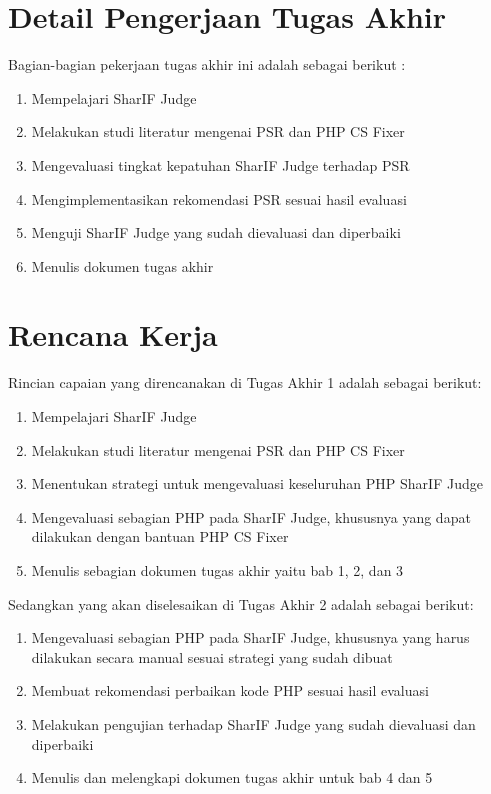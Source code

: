 \documentclass[a4paper,twoside]{article}
\begin{document}
	\section{Detail Pengerjaan Tugas Akhir}
	Bagian-bagian pekerjaan tugas akhir ini adalah sebagai berikut :
	\begin{enumerate}
		\item Mempelajari SharIF Judge 
		\item Melakukan studi literatur mengenai PSR dan PHP CS Fixer
		\item Mengevaluasi tingkat kepatuhan SharIF Judge terhadap PSR
		\item Mengimplementasikan rekomendasi PSR sesuai hasil evaluasi
		\item Menguji SharIF Judge yang sudah dievaluasi dan diperbaiki
		\item Menulis dokumen tugas akhir
	\end{enumerate}
	
	\section{Rencana Kerja}
	Rincian capaian yang direncanakan di Tugas Akhir 1 adalah sebagai berikut:
	\begin{enumerate}
		\item Mempelajari SharIF Judge
		\item Melakukan studi literatur mengenai PSR dan PHP CS Fixer
		\item Menentukan strategi untuk mengevaluasi keseluruhan PHP SharIF Judge
		\item Mengevaluasi sebagian PHP pada SharIF Judge, khususnya yang dapat dilakukan dengan bantuan PHP CS Fixer
		\item Menulis sebagian dokumen tugas akhir yaitu bab 1, 2, dan 3
	\end{enumerate}
	
	Sedangkan yang akan diselesaikan di Tugas Akhir 2 adalah sebagai berikut:
	\begin{enumerate}
		\item Mengevaluasi sebagian PHP pada SharIF Judge, khususnya yang harus dilakukan secara manual sesuai strategi yang sudah dibuat
		\item Membuat rekomendasi perbaikan kode PHP sesuai hasil evaluasi
		\item Melakukan pengujian terhadap SharIF Judge yang sudah dievaluasi dan diperbaiki
		\item Menulis dan melengkapi dokumen tugas akhir untuk bab 4 dan 5
		
	\end{enumerate}
	
\end{document}
